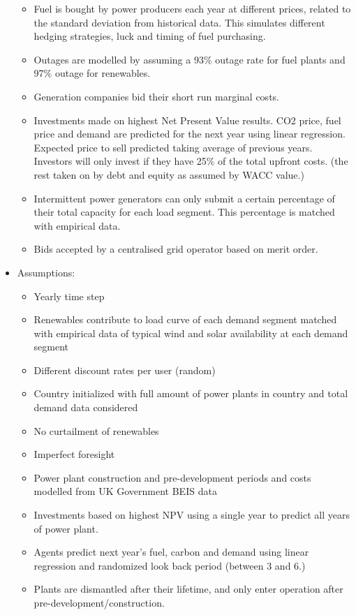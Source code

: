 \begin{itemize}
\begin{itemize}
		\item Fuel is bought by power producers each year at different prices, related to the standard deviation from historical data. This simulates different hedging strategies, luck and timing of fuel purchasing.
		\item Outages are modelled by assuming a 93\% outage rate for fuel plants \cite{Ltd2016} and 97\% outage for renewables. \cite{carroll-j}
		\item Generation companies bid their short run marginal costs.
		\item Investments made on highest Net Present Value results. CO2 price, fuel price and demand are predicted for the next year using linear regression. Expected price to sell predicted taking average of previous years. Investors will only invest if they have 25\% of the total upfront costs. (the rest taken on by debt and equity as assumed by WACC value.)
		\item Intermittent power generators can only submit a certain percentage of their total capacity for each load segment. This percentage is matched with empirical data.
		\item Bids accepted by a centralised grid operator based on merit order.
	\end{itemize}
	\item Assumptions: 
	\begin{itemize}
		\item Yearly time step
		\item Renewables contribute to load curve of each demand segment matched with empirical data of typical wind and solar availability at each demand segment
		\item Different discount rates per user (random)
		\item Country initialized with full amount of power plants in country and total demand data considered
		\item No curtailment of renewables
		\item Imperfect foresight
		\item Power plant construction and pre-development periods and costs modelled from UK Government BEIS data
		\item Investments based on highest NPV using a single year to predict all years of power plant.
		\item Agents predict next year's fuel, carbon and demand using linear regression and randomized look back period (between 3 and 6.)
		\item Plants are dismantled after their lifetime, and only enter operation after pre-development/construction.
		\end{itemize}
\end{itemize}